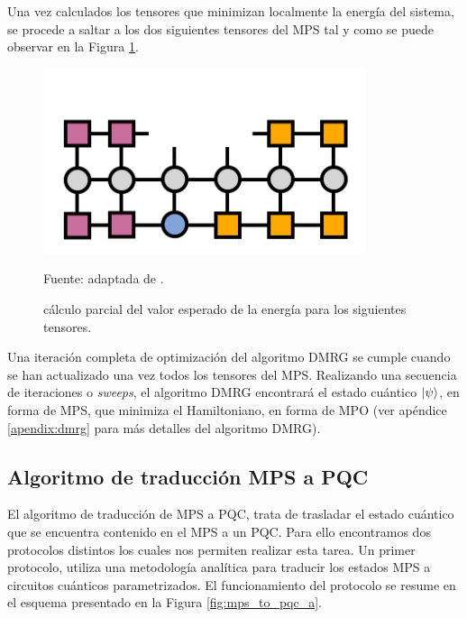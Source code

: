 Una vez calculados los tensores que minimizan localmente la energía del sistema, se procede a saltar a los dos siguientes tensores del MPS tal y como se puede observar en la Figura \ref{fig:mpo_mps_2}.

\begin{figure}[!h]
    \centering
    \includegraphics[scale = 0.8]{img/05-dmrg_mpo_mps_2.png}
    \begin{center}
    \caption{cálculo parcial del valor esperado de la energía para los siguientes tensores.}
    Fuente: adaptada de \cite{tn}.
    \label{fig:mpo_mps_2}
    \end{center}
\end{figure}

\newpage

Una iteración completa de optimización del algoritmo DMRG se cumple cuando se han actualizado una vez todos los tensores del MPS. Realizando una secuencia de iteraciones o \textit{sweeps}, el algoritmo DMRG encontrará el estado cuántico $\ket{\psi}$, en forma de MPS, que minimiza el Hamiltoniano, en forma de MPO (ver apéndice \ref{apendix:dmrg} para más detalles del algoritmo DMRG).

\subsection{Algoritmo de traducción MPS a \mbox{PQC}}
\label{sub_sec:mps_to_pqc}

El algoritmo de traducción de MPS a \mbox{PQC}, trata de trasladar el estado cuántico que se encuentra contenido en el MPS a un \mbox{PQC}. Para ello encontramos dos protocolos distintos los cuales nos permiten realizar esta tarea. Un primer protocolo, \citep{ran} utiliza una metodología analítica para traducir los estados MPS a circuitos cuánticos parametrizados. El funcionamiento del protocolo se resume en el esquema presentado en la Figura \ref{fig:mps_to_pqc_a}.

